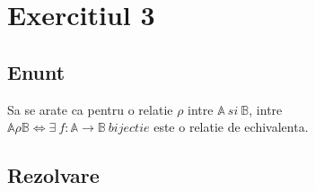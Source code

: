\documentclass{article}
\newcommand{\A}{\mathbb A}
\newcommand{\B}{\mathbb B}
\begin{document}
    \section{Exercitiul 3}
        \subsection{Enunt}
            Sa se arate ca pentru o relatie $\rho$ intre $\A\ si\ \B$, intre \\ $\A \rho \B \iff \exists\ f:\A \rightarrow \B\ bijectie$ este o relatie de echivalenta.\\
        \subsection{Rezolvare}
\end{document}
